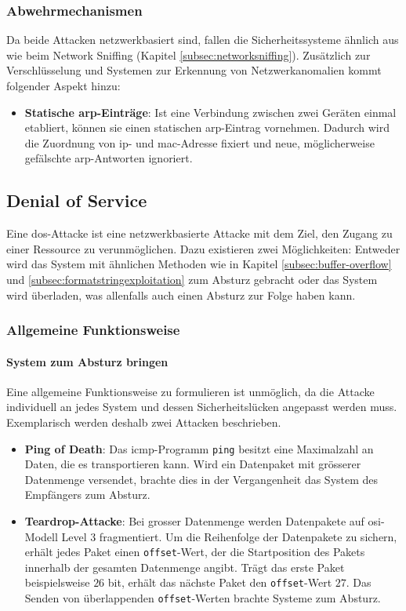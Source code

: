 \documentclass[11pt, a4paper]{article}
\begin{document}
\subsubsection{Abwehrmechanismen}
Da beide Attacken netzwerkbasiert sind, fallen die Sicherheitssysteme ähnlich aus wie beim Network Sniffing (Kapitel \ref{subsec:networksniffing}). Zusätzlich zur Verschlüsselung und Systemen zur Erkennung von Netzwerkanomalien kommt folgender Aspekt hinzu:

\begin{itemize}
	\item \textbf{Statische \gls{arp}-Einträge}: Ist eine Verbindung zwischen zwei Geräten einmal etabliert, können sie einen statischen \gls{arp}-Eintrag vornehmen. Dadurch wird die Zuordnung von \gls{ip}- und \gls{mac}-Adresse fixiert und neue, möglicherweise gefälschte \gls{arp}-Antworten ignoriert.~\cite{WhatisAR:online}
\end{itemize}

\subsection{Denial of Service}
Eine \gls{dos}-Attacke ist eine netzwerkbasierte Attacke mit dem Ziel, den Zugang zu einer Ressource zu verunmöglichen. Dazu existieren zwei Möglichkeiten: Entweder wird das System mit ähnlichen Methoden wie in Kapitel \ref{subsec:buffer-overflow} und \ref{subsec:formatstringexploitation} zum Absturz gebracht oder das System wird überladen, was allenfalls auch einen Absturz zur Folge haben kann.

\subsubsection{Allgemeine Funktionsweise}
\paragraph{System zum Absturz bringen}
Eine allgemeine Funktionsweise zu formulieren ist unmöglich, da die Attacke individuell an jedes System und dessen Sicherheitslücken angepasst werden muss. Exemplarisch werden deshalb zwei Attacken beschrieben.
\begin{itemize}
	\item \textbf{Ping of Death}: Das \gls{icmp}-Programm \texttt{ping} besitzt eine Maximalzahl an Daten, die es transportieren kann. Wird ein Datenpaket mit grösserer Datenmenge versendet, brachte dies in der Vergangenheit das System des Empfängers zum Absturz.
	\item \textbf{Teardrop-Attacke}: Bei grosser Datenmenge werden Datenpakete auf \gls{osi}-Modell Level 3 fragmentiert. Um die Reihenfolge der Datenpakete zu sichern, erhält jedes Paket einen \texttt{offset}-Wert, der die Startposition des Pakets innerhalb der gesamten Datenmenge angibt. Trägt das erste Paket beispielsweise \(26\) \gls{bit}, erhält das nächste Paket den \texttt{offset}-Wert \(27\). Das Senden von überlappenden \texttt{offset}-Werten brachte Systeme zum Absturz.
\end{itemize}
\end{document}
